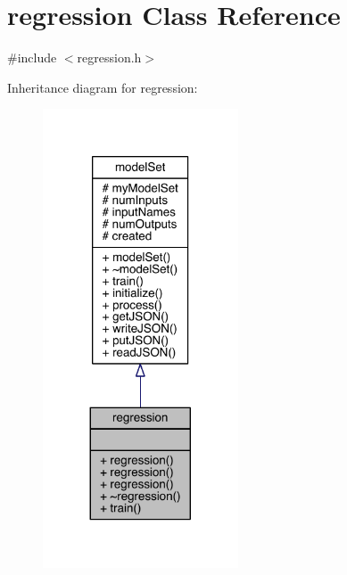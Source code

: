 \hypertarget{classregression}{}\section{regression Class Reference}
\label{classregression}


{\ttfamily \#include $<$regression.\+h$>$}



Inheritance diagram for regression\+:
\nopagebreak
\begin{figure}[H]
\begin{center}
\leavevmode
\includegraphics[width=164pt]{classregression__inherit__graph}
\end{center}
\end{figure}


